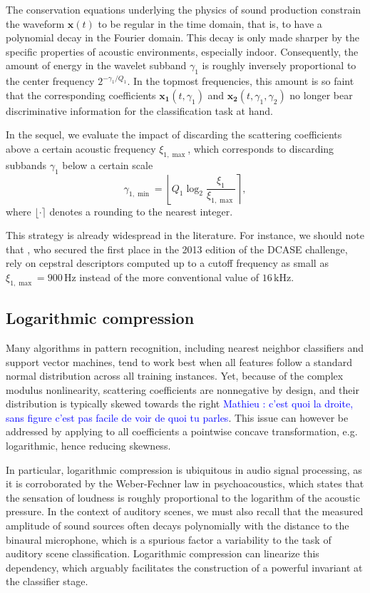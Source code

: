 \documentclass[journal]{IEEEtran}
\makeatletter
\newcommand*{\eg}{e.g.\@\xspace}
\newcommand{\ml}[1]{\textcolor{blue}{ Mathieu : #1}}
\makeatother
\begin{document}
The conservation equations underlying the physics of sound production constrain the waveform $\boldsymbol{x}(t)$ to be regular in the time domain, that is, to have a polynomial decay in the Fourier domain.
This decay is only made sharper by the specific properties of acoustic environments, especially indoor.
Consequently, the amount of energy in the wavelet subband $\gamma_1$ is roughly inversely proportional to the center frequency $2^{-\gamma_1/Q_1}$.
In the topmost frequencies, this amount is so faint that the corresponding coefficients $\boldsymbol{x_1}(t,\gamma_1)$ and $\boldsymbol{x_2}(t,\gamma_1,\gamma_2)$ no longer bear discriminative information for the classification task at hand.

In the sequel, we evaluate the impact of discarding the scattering coefficients above a certain acoustic frequency $\xi_{1,\max}$, which corresponds to discarding subbands $\gamma_1$ below a certain scale
\begin{equation}
\gamma_{1,\min} =
\left\lfloor Q_1 \log_2 \frac{\xi_1}{\xi_{1,\max}} \right\rceil,
\end{equation}
where $\lfloor \cdot \rceil$ denotes a rounding to the nearest integer.

This strategy is already widespread in the literature.
For instance, we should note that \cite{roma2013}, who secured the first place in the 2013 edition of the DCASE challenge, rely on cepstral descriptors computed up to a cutoff frequency as small as $\xi_{1,\max}  = 900\,\mathrm{Hz}$ instead of the more conventional value of $16\,\mathrm{kHz}$.

\subsection{Logarithmic compression}
Many algorithms in pattern recognition, including nearest neighbor classifiers and support vector machines, tend to work best when all features follow a standard normal distribution across all training instances.
Yet, because of the complex modulus nonlinearity, scattering coefficients are nonnegative by design, and their distribution is typically skewed towards the right \ml{c'est quoi la droite, sans figure c'est pas facile de voir de quoi tu parles}.
This issue can however be addressed by applying to all coefficients a pointwise concave transformation, \eg logarithmic, hence reducing skewness.

In particular, logarithmic compression is ubiquitous in audio signal processing, as it is corroborated by the Weber-Fechner law in psychoacoustics, which states that the sensation of loudness is roughly proportional to the logarithm of the acoustic pressure.
In the context of auditory scenes, we must also recall that the measured amplitude of sound sources often decays polynomially with the distance to the binaural microphone, which is a spurious factor a variability to the task of auditory scene classification.
Logarithmic compression can linearize this dependency, which arguably facilitates the construction of a powerful invariant at the classifier stage.
\end{document}
